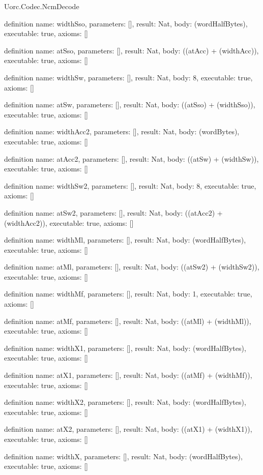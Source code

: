 \begin{lexlean}{Uorc.Codec.NcmDecode}
\begin{semanticmodule}
definition{
  name: widthSso,
  parameters: [],
  result: Nat,
  body: (wordHalfBytes),
  executable: true,
  axioms: []
}

definition{
  name: atSso,
  parameters: [],
  result: Nat,
  body: ((atAcc) + (widthAcc)),
  executable: true,
  axioms: []
}

definition{
  name: widthSw,
  parameters: [],
  result: Nat,
  body: 8,
  executable: true,
  axioms: []
}

definition{
  name: atSw,
  parameters: [],
  result: Nat,
  body: ((atSso) + (widthSso)),
  executable: true,
  axioms: []
}

definition{
  name: widthAcc2,
  parameters: [],
  result: Nat,
  body: (wordBytes),
  executable: true,
  axioms: []
}

definition{
  name: atAcc2,
  parameters: [],
  result: Nat,
  body: ((atSw) + (widthSw)),
  executable: true,
  axioms: []
}

definition{
  name: widthSw2,
  parameters: [],
  result: Nat,
  body: 8,
  executable: true,
  axioms: []
}

definition{
  name: atSw2,
  parameters: [],
  result: Nat,
  body: ((atAcc2) + (widthAcc2)),
  executable: true,
  axioms: []
}

definition{
  name: widthMl,
  parameters: [],
  result: Nat,
  body: (wordHalfBytes),
  executable: true,
  axioms: []
}

definition{
  name: atMl,
  parameters: [],
  result: Nat,
  body: ((atSw2) + (widthSw2)),
  executable: true,
  axioms: []
}

definition{
  name: widthMf,
  parameters: [],
  result: Nat,
  body: 1,
  executable: true,
  axioms: []
}

definition{
  name: atMf,
  parameters: [],
  result: Nat,
  body: ((atMl) + (widthMl)),
  executable: true,
  axioms: []
}

definition{
  name: widthX1,
  parameters: [],
  result: Nat,
  body: (wordHalfBytes),
  executable: true,
  axioms: []
}

definition{
  name: atX1,
  parameters: [],
  result: Nat,
  body: ((atMf) + (widthMf)),
  executable: true,
  axioms: []
}

definition{
  name: widthX2,
  parameters: [],
  result: Nat,
  body: (wordHalfBytes),
  executable: true,
  axioms: []
}

definition{
  name: atX2,
  parameters: [],
  result: Nat,
  body: ((atX1) + (widthX1)),
  executable: true,
  axioms: []
}

definition{
  name: widthX,
  parameters: [],
  result: Nat,
  body: (wordHalfBytes),
  executable: true,
  axioms: []
}


\end{semanticmodule}
\end{lexlean}
